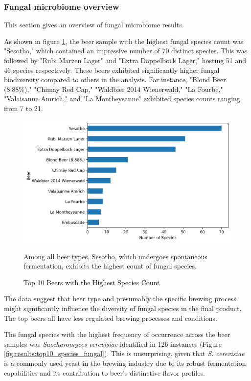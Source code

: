 \subsubsection{Fungal microbiome overview}

This section gives an overview of fungal microbiome results.

As shown in figure \ref{fig:methods:top10_beer_fungal}, the beer sample with the highest fungal species count was "Sesotho," which contained an impressive number of 70 distinct species. This was followed by "Rubi Marzen Lager" and "Extra Doppelbock Lager," hosting 51 and 46 species respectively. These beers exhibited significantly higher fungal biodiversity compared to others in the analysis. For instance, "Blond Beer (8.88\%)," "Chimay Red Cap," "Waldbier 2014 Wienerwald," "La Fourbe," "Valaisanne Amrich," and "La Montheysanne" exhibited species counts ranging from 7 to 21.

    \begin{figure}[H]
        \centering
        \includegraphics[scale=0.7]{images/overview/top10_beers_fungal.png}
        \caption{Top 10 Beers with the Highest Species Count}
        \small Among all beer types, Sesotho, which undergoes spontaneous fermentation, exhibits the highest count of fungal species.
        \label{fig:methods:top10_beer_fungal}
    \end{figure}
    
The data suggest that beer type and presumably the specific brewing process might significantly influence the diversity of fungal species in the final product. The top beers all have less regulated brewing processes and conditions.

The fungal species with the highest frequency of occurrence across the beer samples was \textit{Saccharomyces cerevisiae} identified in 126 instances (Figure \ref{fig:results:top10_species_fungal}). This is unsurprising, given that \textit{S. cerevisiae} is a commonly used yeast in the brewing industry due to its robust fermentation capabilities and its contribution to beer's distinctive flavor profiles.

